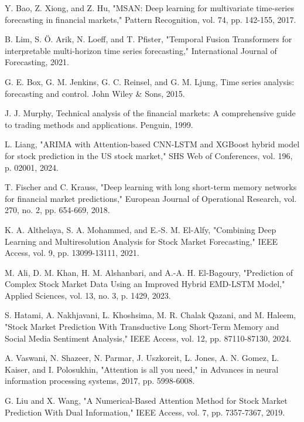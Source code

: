 \documentclass[conference]{IEEEtran}
\begin{document}
\begin{thebibliography}{00}
 Y. Bao, Z. Xiong, and Z. Hu, "MSAN: Deep learning for multivariate time-series forecasting in financial markets," Pattern Recognition, vol. 74, pp. 142-155, 2017.

 B. Lim, S. Ö. Arik, N. Loeff, and T. Pfister, "Temporal Fusion Transformers for interpretable multi-horizon time series forecasting," International Journal of Forecasting, 2021.

 G. E. Box, G. M. Jenkins, G. C. Reinsel, and G. M. Ljung, Time series analysis: forecasting and control. John Wiley \& Sons, 2015.

 J. J. Murphy, Technical analysis of the financial markets: A comprehensive guide to trading methods and applications. Penguin, 1999.

 L. Liang, "ARIMA with Attention-based CNN-LSTM and XGBoost hybrid model for stock prediction in the US stock market," SHS Web of Conferences, vol. 196, p. 02001, 2024.

 T. Fischer and C. Krauss, "Deep learning with long short-term memory networks for financial market predictions," European Journal of Operational Research, vol. 270, no. 2, pp. 654-669, 2018.

 K. A. Althelaya, S. A. Mohammed, and E.-S. M. El-Alfy, "Combining Deep Learning and Multiresolution Analysis for Stock Market Forecasting," IEEE Access, vol. 9, pp. 13099-13111, 2021.

 M. Ali, D. M. Khan, H. M. Alshanbari, and A.-A. H. El-Bagoury, "Prediction of Complex Stock Market Data Using an Improved Hybrid EMD-LSTM Model," Applied Sciences, vol. 13, no. 3, p. 1429, 2023.

 S. Hatami, A. Nakhjavani, L. Khoshsima, M. R. Chalak Qazani, and M. Haleem, "Stock Market Prediction With Transductive Long Short-Term Memory and Social Media Sentiment Analysis," IEEE Access, vol. 12, pp. 87110-87130, 2024.

 A. Vaswani, N. Shazeer, N. Parmar, J. Uszkoreit, L. Jones, A. N. Gomez, L. Kaiser, and I. Polosukhin, "Attention is all you need," in Advances in neural information processing systems, 2017, pp. 5998-6008.

 G. Liu and X. Wang, "A Numerical-Based Attention Method for Stock Market Prediction With Dual Information," IEEE Access, vol. 7, pp. 7357-7367, 2019.


\end{thebibliography}
\end{document}
